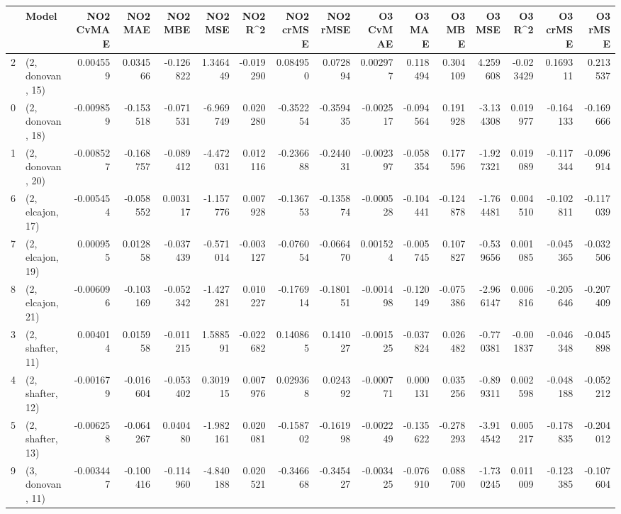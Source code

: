 \begin{tabular}{llrrrrrrrrrrrrrr}
\toprule
{} &             Model &  NO2 CvMAE &   NO2 MAE &   NO2 MBE &    NO2 MSE &   NO2 R\textasciicircum2 &  NO2 crMSE &  NO2 rMSE &  O3 CvMAE &    O3 MAE &    O3 MBE &     O3 MSE &    O3 R\textasciicircum2 &  O3 crMSE &   O3 rMSE \\
\midrule
2  &  (2, donovan, 15) &   0.004559 &  0.034566 & -0.126822 &   1.346449 & -0.019290 &   0.084950 &  0.072894 &  0.002977 &  0.118494 &  0.304109 &   4.259608 & -0.023429 &  0.169311 &  0.213537 \\
0  &  (2, donovan, 18) &  -0.009859 & -0.153518 & -0.071531 &  -6.969749 &  0.020280 &  -0.352254 & -0.359435 & -0.002517 & -0.094564 &  0.191928 &  -3.134308 &  0.019977 & -0.164133 & -0.169666 \\
1  &  (2, donovan, 20) &  -0.008527 & -0.168757 & -0.089412 &  -4.472031 &  0.012116 &  -0.236688 & -0.244031 & -0.002397 & -0.058354 &  0.177596 &  -1.927321 &  0.019089 & -0.117344 & -0.096914 \\
6  &  (2, elcajon, 17) &  -0.005454 & -0.058552 &  0.003117 &  -1.157776 &  0.007928 &  -0.136753 & -0.135874 & -0.000528 & -0.104441 & -0.124878 &  -1.764481 &  0.004510 & -0.102811 & -0.117039 \\
7  &  (2, elcajon, 19) &   0.000955 &  0.012858 & -0.037439 &  -0.571014 & -0.003127 &  -0.076054 & -0.066470 &  0.001524 & -0.005745 &  0.107827 &  -0.539656 &  0.001085 & -0.045365 & -0.032506 \\
8  &  (2, elcajon, 21) &  -0.006096 & -0.103169 & -0.052342 &  -1.427281 &  0.010227 &  -0.176914 & -0.180151 & -0.001498 & -0.120149 & -0.075386 &  -2.966147 &  0.006816 & -0.205646 & -0.207409 \\
3  &  (2, shafter, 11) &   0.004014 &  0.015958 & -0.011215 &   1.588591 & -0.022682 &   0.140865 &  0.141027 & -0.001525 & -0.037824 &  0.026482 &  -0.770381 & -0.001837 & -0.046348 & -0.045898 \\
4  &  (2, shafter, 12) &  -0.001679 & -0.016604 & -0.053402 &   0.301915 &  0.007976 &   0.029368 &  0.024392 & -0.000771 &  0.000131 &  0.035256 &  -0.899311 &  0.002598 & -0.048188 & -0.052212 \\
5  &  (2, shafter, 13) &  -0.006258 & -0.064267 &  0.040480 &  -1.982161 &  0.020081 &  -0.158702 & -0.161998 & -0.002249 & -0.135622 & -0.278293 &  -3.914542 &  0.005217 & -0.178835 & -0.204012 \\
9  &  (3, donovan, 11) &  -0.003447 & -0.100416 & -0.114960 &  -4.840188 &  0.020521 &  -0.346668 & -0.345427 & -0.003425 & -0.076910 &  0.088700 &  -1.730245 &  0.011009 & -0.123385 & -0.107604 \\

\end{tabular}
